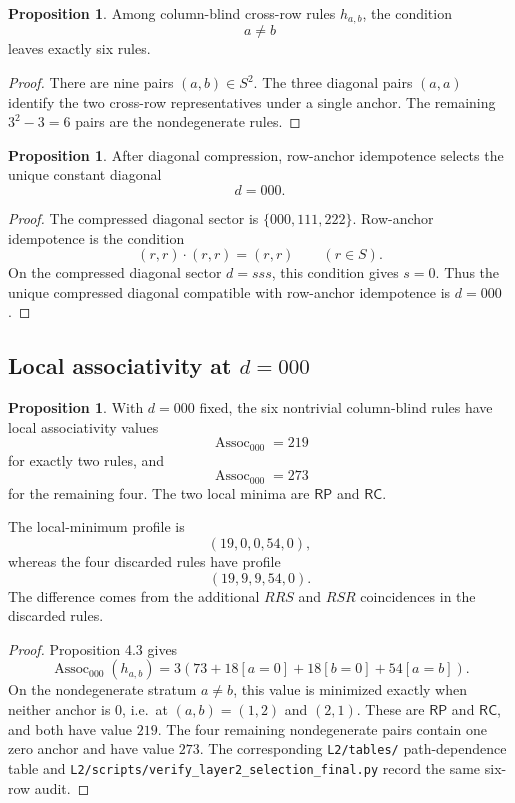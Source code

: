 \documentclass[11pt]{article}
\theoremstyle{definition}
\newtheorem{proposition}[theorem]{Proposition}
\newcommand{\RP}{\mathsf{RP}}
\newcommand{\RC}{\mathsf{RC}}
\begin{document}
\begin{proposition}
\label{prop:10.1}
Among column-blind cross-row rules
\(h_{a,b}\), the condition \[
a\ne b
\] leaves exactly six rules.
\end{proposition}

\begin{proof}
There are nine pairs \((a,b)\in S^2\). The three
diagonal pairs \((a,a)\) identify the two cross-row representatives under a
single anchor. The remaining \(3^2-3=6\) pairs are the nondegenerate rules.
\end{proof}

\begin{proposition}
\label{prop:10.2}
After diagonal compression, row-anchor
idempotence selects the unique constant diagonal \[
d=000.
\]
\end{proposition}

\begin{proof}
The compressed diagonal sector is \(\{000,111,222\}\).
Row-anchor idempotence is the condition
\[
(r,r)\cdot(r,r)=(r,r)\qquad(r\in S).
\]
On the compressed diagonal sector \(d=sss\), this condition gives \(s=0\).
Thus the unique compressed diagonal compatible with row-anchor idempotence
is \(d=000\).
\end{proof}

\subsection{\texorpdfstring{Local associativity at
\(d=000\)}{Local associativity at d=000}}\label{local-associativity-at-d000}

\begin{proposition}
\label{prop:10.3}
With \(d=000\) fixed, the six nontrivial
column-blind rules have local associativity values \[
\operatorname{Assoc}_{000}=219
\] for exactly two rules, and \[
\operatorname{Assoc}_{000}=273
\] for the remaining four. The two local minima are \(\RP\) and
\(\RC\).

The local-minimum profile is \[
(19,0,0,54,0),
\] whereas the four discarded rules have profile \[
(19,9,9,54,0).
\] The difference comes from the additional \(RRS\) and \(RSR\)
coincidences in the discarded rules.
\end{proposition}

\begin{proof}
Proposition 4.3 gives \[
\operatorname{Assoc}_{000}(h_{a,b})
=
3\left(73+18[a=0]+18[b=0]+54[a=b]\right).
\] On the nondegenerate stratum \(a\ne b\), this value is minimized
exactly when neither anchor is \(0\), i.e.~at \((a,b)=(1,2)\) and
\((2,1)\). These are \(\RP\) and \(\RC\), and both have value
\(219\). The four remaining nondegenerate pairs contain one zero anchor
and have value \(273\). The corresponding \texttt{L2/tables/} path-dependence table and
\texttt{L2/scripts/verify\_layer2\_selection\_final.py} record the same
six-row audit.
\end{proof}
\end{document}
